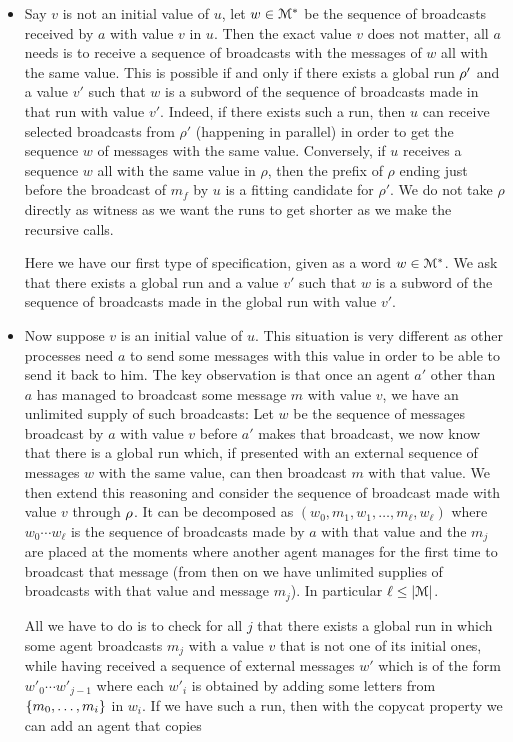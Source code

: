 \begin{itemize}
	\item 
	Say $v$ is not an initial value of $u$, let $w \in \mathcal{M}^*$ be the sequence of broadcasts received by $a$ with value $v$ in $u$. Then the exact value $v$ does not matter, all $a$ needs is to receive a sequence of broadcasts with the messages of $w$ all with the same value. This is possible if and only if there exists a global run $\rho'$ and a value $v'$ such that $w$ is a subword of the sequence of broadcasts made in that run with value $v'$. Indeed, if there exists such a run, then $u$ can receive selected broadcasts from $\rho'$ (happening in parallel) in order to get the sequence $w$ of messages with the same value. Conversely, if $u$ receives a sequence $w$ all with the same value in $\rho$, then the prefix of $\rho$ ending just before the broadcast of $m_f$ by $u$ is a fitting candidate for $\rho'$.
	We do not take $\rho$ directly as witness as we want the runs to get shorter as we make the recursive calls.
	
	Here we have our first type of specification, given as a word $w \in \mathcal{M}^*$. We ask that there exists a global run and a value $v'$ such that $w$ is a subword of the sequence of broadcasts made in the global run with value $v'$.
	
	
	\item 	
	Now suppose $v$ is an initial value of $u$. This situation is very different as other processes need $a$ to send some messages with this value in order to be able to send it back to him.
	The key observation is that once an agent $a'$ other than $a$ has managed to broadcast some message $m$ with value $v$, we have an unlimited supply of such broadcasts:
	Let $w$ be the sequence of messages broadcast by $a$ with value $v$ before $a'$ makes that broadcast, we now know that there is a global run which, if presented with an external sequence of messages $w$ with the same value, can then broadcast $m$ with that value.
	We then extend this reasoning and consider the sequence of broadcast made with value $v$ through $\rho$. It can be decomposed as  $(w_0, m_1, w_1, \ldots, m_\ell, w_\ell)$ where $w_0 \cdots w_\ell$ is the sequence of broadcasts made by $a$ with that value and the $m_j$ are placed at the moments where another agent manages for the first time to broadcast that message (from then on we have unlimited supplies of broadcasts with that value and message $m_j$). In particular $\ell \leq |\mathcal{M}|$.
	
	All we have to do is to check for all $j$ that there exists a global run in which some agent broadcasts $m_j$ with a value $v$ that is not one of its initial ones, while having received a sequence of external messages $w'$ which is of the form $w'_0\cdots w'_{j-1}$ where each $w'_i$ is obtained by adding some letters from $\{m_0, \ldots, m_i\}$ in $w_i$.
	If we have such a run, then with the copycat property we can add an  agent that copies 
	

\end{itemize}

